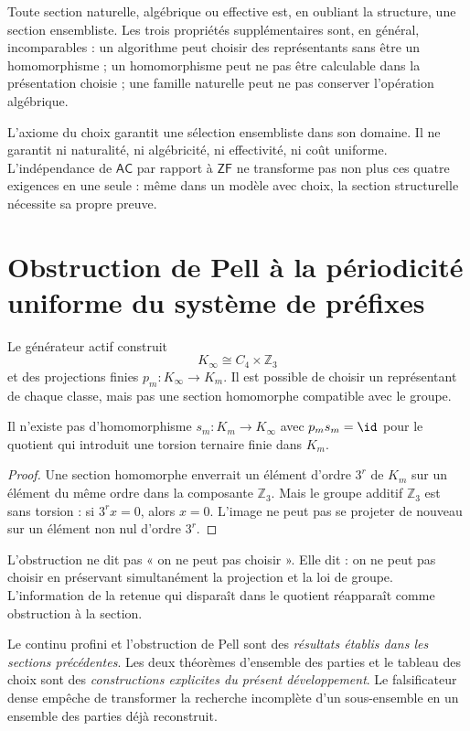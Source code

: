 Toute section naturelle, algébrique ou effective est, en oubliant la structure, une
section ensembliste. Les trois propriétés supplémentaires sont, en général,
incomparables : un algorithme peut choisir des représentants sans être un homomorphisme ;
un homomorphisme peut ne pas être calculable dans la présentation choisie ; une
famille naturelle peut ne pas conserver l'opération algébrique.

\begin{remark}
L'axiome du choix garantit une sélection ensembliste dans son
domaine. Il ne garantit ni naturalité, ni algébricité, ni effectivité, ni coût
uniforme. L'indépendance de \(\mathsf{AC}\) par rapport à \(\mathsf{ZF}\)
ne transforme pas non plus ces quatre exigences en une seule : même dans un modèle
avec choix, la section structurelle nécessite sa propre preuve.
\end{remark}

\section{Obstruction de Pell à la périodicité uniforme du système de préfixes}

Le générateur actif construit
\[
  K_\infty\cong C_4\times\mathbb Z_3
\]
et des projections finies \(p_m:K_\infty\to K_m\). Il est possible de choisir un
représentant de chaque classe, mais pas une section homomorphe compatible avec le
groupe.

\begin{proposition}
Il n'existe pas d'homomorphisme \(s_m:K_m\to K_\infty\) avec
\(p_ms_m=\id\) pour le quotient qui introduit une torsion ternaire finie dans
\(K_m\).
\end{proposition}

\begin{proof}
Une section homomorphe enverrait un élément d'ordre \(3^r\) de \(K_m\) sur un
élément du même ordre dans la composante \(\mathbb Z_3\). Mais le groupe
additif \(\mathbb Z_3\) est sans torsion : si \(3^rx=0\), alors \(x=0\).
L'image ne peut pas se projeter de nouveau sur un élément non nul d'ordre
\(3^r\).
\end{proof}

L'obstruction ne dit pas « on ne peut pas choisir ». Elle dit : on ne peut pas choisir
en préservant simultanément la projection et la loi de groupe. L'information de la
retenue qui disparaît dans le quotient réapparaît comme obstruction à la section.

\begin{remark}
Le continu profini et l'obstruction de Pell sont des
\emph{résultats établis dans les sections précédentes}. Les deux théorèmes d'ensemble des parties et le tableau des
choix sont des \emph{constructions explicites du présent développement}. Le falsificateur dense empêche
de transformer la recherche incomplète d'un sous-ensemble en un ensemble des parties déjà
reconstruit.
\end{remark}
